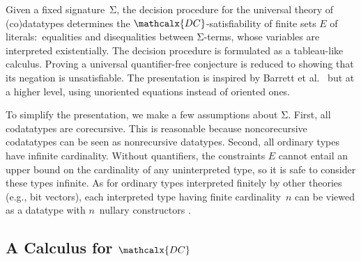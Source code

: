 \documentclass[smallcondensed,draft]{svjour3}
\newcommand\Sig{\mathrm{\Sigma}}
\newcommand\const[1]{\textsf{#1}}
\renewcommand{\vec}[1]{\bar #1}
\newcommand{\Ec}{E}
\newcommand{\thD}{\mathcalx{DC}}
\newcommand\Types{\mathcalx{Y}}
\newcommand\Codata{\Types_{\mathrm{codt}}}
\newcommand\negvthinspace{\kern-0.083333em}
\begin{document}
Given a fixed signature~$\Sig$,
the decision procedure for the universal theory of (co)data\-types %
determines the
$\thD$-satisfiability of finite sets $\Ec$ of literals:\ equalities
and disequalities between $\Sig$-terms,
whose variables are interpreted existentially.
The decision procedure is formulated as a tableau-like calculus.
Proving a universal quantifier-free conjecture is reduced to showing that
its negation is unsatisfiable. The presentation is
inspired by Barrett et al.\ \cite{barrett-et-al-2007} but at
a higher level, using unoriented equations instead of oriented ones.

To simplify the presentation, we make a few assumptions about
$\Sig$.
First, all codatatypes %
are corecursive. This is reasonable
because noncorecursive codatatypes can be seen as nonrecursive
datatypes.
Second, all ordinary types have infinite cardinality.
Without quantifiers, the constraints $\Ec$ cannot entail an upper
bound on the cardinality of any uninterpreted type, so it is safe to consider these types
infinite. As for ordinary types interpreted finitely by other theories (e.g.,
bit vectors), each interpreted type having finite cardinality~$n$
can be viewed as a %
datatype with $n$~nullary constructors
\cite{barrett-et-al-2007}.


\subsection{A Calculus for $\thD$}
\label{sec:calculus-for-dc}


\end{document}

